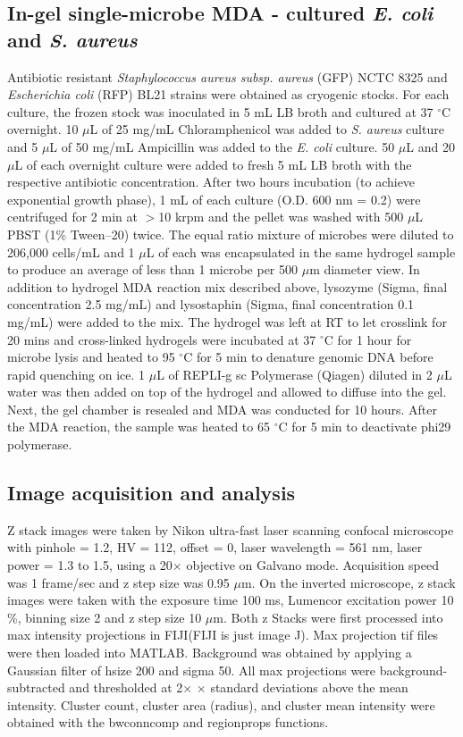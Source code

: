 \subsection{In-gel single-microbe MDA - cultured \textit{E. coli}  and \textit{S. aureus} }
Antibiotic resistant \textit{Staphylococcus aureus subsp. aureus} (GFP) NCTC 8325 and \textit{Escherichia coli} (RFP) BL21 strains were obtained as cryogenic stocks. For each culture, the frozen stock was inoculated in 5 mL LB broth and cultured at 37 $^{\circ}$C overnight. 10 $\mu$L of 25 mg\slash mL Chloramphenicol was added to \textit{S. aureus}  culture and 5 $\mu$L of 50 mg\slash mL Ampicillin was added to the \textit{E. coli}  culture. 50 $\mu$L and 20 $\mu$L of each overnight culture were added to fresh 5 mL LB broth with the respective antibiotic concentration. After two hours incubation (to achieve exponential growth phase), 1 mL of each culture (O.D. 600 nm = 0.2) were centrifuged for 2 min at $>$10 krpm and the pellet was washed with 500 $\mu$L PBST (1\% Tween--20) twice. The equal ratio mixture of microbes were diluted to 206,000 cells\slash mL and 1 $\mu$L of each was encapsulated in the same hydrogel sample to produce an average of less than 1 microbe per 500 $\mu$m diameter view. In addition to hydrogel MDA reaction mix described above, lysozyme (Sigma, final concentration 2.5 mg\slash mL) and lysostaphin (Sigma, final concentration 0.1 mg\slash mL) were added to the mix. The hydrogel was left at RT to let crosslink for 20 mins and cross-linked hydrogels were incubated at 37 $^{\circ}$C for 1 hour for microbe lysis and heated to 95 $^{\circ}$C for 5 min to denature genomic DNA before rapid quenching on ice. 1 $\mu$L of REPLI-g sc Polymerase (Qiagen) diluted in 2 $\mu$L water was then added on top of the hydrogel and allowed to diffuse into the gel. Next, the gel chamber is resealed and MDA was conducted for 10 hours. After the MDA reaction, the sample was heated to 65 $^{\circ}$C for 5 min to deactivate phi29 polymerase.

\subsection{Image acquisition and analysis}
Z stack images were taken by Nikon ultra-fast laser scanning confocal microscope with pinhole = 1.2, HV = 112, offset = 0, laser wavelength = 561 nm, laser power = 1.3 to 1.5, using a 20$\times$ objective on Galvano mode. Acquisition speed was 1 frame\slash sec and z step size was 0.95 $\mu$m. On the inverted microscope, z stack images were taken with the exposure time 100 ms, Lumencor excitation power 10 \%, binning size 2 and z step size 10 $\mu$m. Both z Stacks were first processed into max intensity projections in FIJI(FIJI is just image J). Max projection tif files were then loaded into MATLAB. Background was obtained by applying a Gaussian filter of hsize 200 and sigma 50. All max projections were background-subtracted and thresholded at 2$\times$ $\times$ standard deviations above the mean intensity. Cluster count, cluster area (radius), and cluster mean intensity were obtained with the bwconncomp and regionprops functions.

